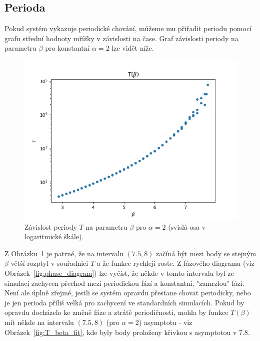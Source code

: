 \documentclass{article}
\begin{document}
\subsection{Perioda}
Pokud systém vykazuje periodické chování, můžeme mu přiřadit periodu pomocí grafu střední hodnoty mřížky v závislosti na čase. Graf závislosti periody na parametru $\beta$ pro konstantní $\alpha = 2$ lze vidět níže.

\begin{figure}[H]
 \includegraphics{T_beta_only}
 \caption{Závislost periody $T$ na parametru $\beta$ pro $\alpha = 2$ (svislá osa v logaritmické škále).}
 \label{fig:T_beta_only}
\end{figure}

Z Obrázku~\ref{fig:T_beta_only} je patrné, že na intervalu $(7.5,8)$ začíná být mezi body se stejným $\beta$ větší rozptyl v souřadnici $T$ a že funkce rychleji roste. Z fázového diagramu (viz Obrázek~\ref{fig:phase_diagram}) lze vyčíst, že někde v tomto intervalu byl ze simulací zachycen přechod mezi periodickou fází a konstantní, "zamrzlou" fází. Není ale úplně zřejmé, jestli se systém opravdu přestane chovat periodicky, nebo je jen perioda příliš velká pro zachycení ve standardních simulacích. Pokud by opravdu docházelo ke změně fáze a ztrátě periodičnosti, mohla by funkce $T(\beta)$ mít někde na intervalu $(7.5, 8)$ (pro $\alpha = 2$) asymptotu - viz Obrázek~\ref{fig:T_beta_fit}, kde byly body proloženy křivkou s asymptotou v $7.8$.
\end{document}
